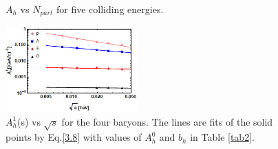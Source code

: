 \documentclass[twocolumn,aps,superscriptaddress,showpacs,nofootinbib,floatfix]{revtex4}
\begin{document}
\begin{figure}[pht]
	\caption{$A_h$ vs $N_{part}$ for five colliding energies.}
	\label{fig7}
\end{figure}
\begin{figure}[pht]
	\includegraphics[width=0.45\textwidth]{pic8.png}
	\caption{$A_h^1$(s) vs $\sqrt{s}$ for the four baryons. The lines are fits of the solid points by Eq.\ref{3.8} with values of $A_h^0$ and $b_h$ in Table \ref{tab2}.}
	\label{fig8}
\end{figure}
\end{document}
